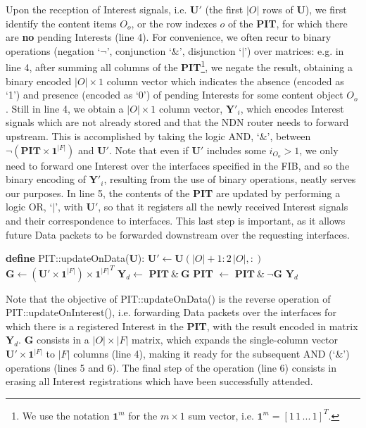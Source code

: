 Upon the reception of Interest signals, i.e. $\textbf{U}'$ (the first $|O|$ rows 
of $\textbf{U}$), we first identify the content items $O_o$, or the row indexes $o$ of the 
\textbf{PIT}, for which there are \textbf{no} pending Interests (line 4). For 
convenience, we often recur to binary operations (negation `$\neg$', 
conjunction `$\&$', disjunction `$|$') over matrices: e.g. in line 4, after 
summing all columns of the \textbf{PIT}\footnote{We use the notation $\textbf{1}^{m}$ for the $m \times 1$
sum vector, i.e. $\textbf{1}^{m} = [1\,1\,...\,1]^{T}$.}, we negate the 
result, obtaining a binary encoded $|O| \times 1$ 
column vector which indicates the absence (encoded as  `1') and presence 
(encoded as `0') of pending Interests for some content object $O_o$. Still in 
line 4, we obtain a $|O| \times 1$ column vector, $\textbf{Y}'_i$, which encodes 
Interest signals which are not already stored and that the NDN router needs to forward upstream. This is 
accomplished by taking the logic AND, `$\&$', between $\neg(\textbf{PIT} \times \textbf{1}^{|F|})$ and 
$\textbf{U}'$. Note that even 
if $\textbf{U}'$ includes some $i_{O_o} > 1$, we only need to forward one Interest 
over the interfaces specified in the FIB, and so the binary encoding of $\textbf{Y}'_i$, 
resulting from the use of binary operations, neatly serves our purposes. 
In line 5, the 
contents of the \textbf{PIT} are updated by performing a logic OR, `$|$', with $\textbf{U}'$, so 
that it registers all the newly received 
Interest signals and their correspondence to interfaces. This last step is important, 
as it allows future Data packets to be forwarded downstream over the requesting 
interfaces.\shortvertbreak

\begin{algorithmic}[1]

\State \textbf{define} PIT::updateOnData($\textbf{U}$):
\State
    \State $\textbf{U}' \leftarrow \textbf{U}(|O|+1:2\,|O|,:)$
    \State $\textbf{G} \leftarrow (\textbf{U}' \times \textbf{1}^{|F|}) \times {\textbf{1}^{|F|}}^{T}$
    \State $\textbf{Y}_d \leftarrow$ $\textbf{PIT} \ \& \ \textbf{G}$
    \State \textbf{PIT} $\leftarrow$ $\textbf{PIT} \ \& \ \neg\textbf{G}$ 
    \State \Return $\textbf{Y}_d$

\end{algorithmic}\shortvertbreak

Note that 
the objective of PIT::updateOnData() is the reverse operation of PIT::updateOnInterest(), i.e. forwarding Data 
packets over the interfaces for which there is a registered Interest in the \textbf{PIT}, with 
the result encoded in matrix $\textbf{Y}_d$. $\textbf{G}$ consists in a $|O| \times |F|$ matrix, which expands the single-column 
vector $\textbf{U}' \times \textbf{1}^{|F|}$ to $|F|$ columns (line 4), making it ready 
for the subsequent AND (`\&') operations (lines 5 and 6). The final 
step of the operation (line 6) consists in erasing 
all Interest registrations which have been successfully attended.\shortvertbreak

